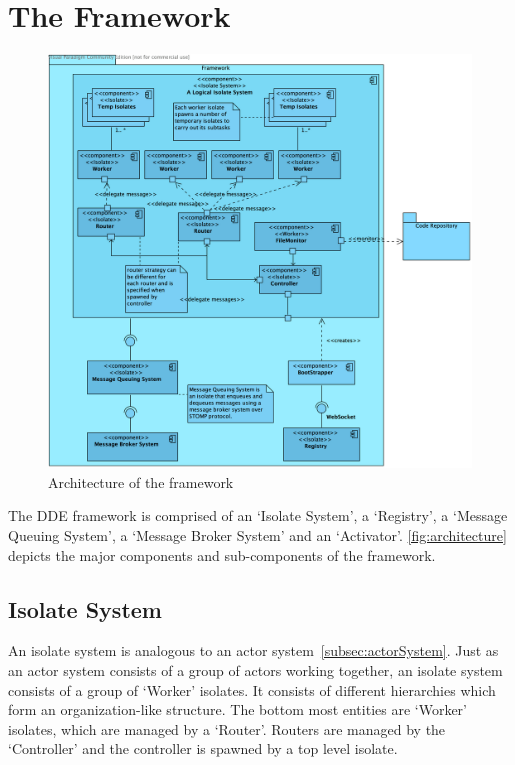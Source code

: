 \section{The Framework}
\begin{figure}[H]
  \centering
  \includegraphics[width=1\textwidth]{figures/componentDiagram}
  \caption[Architecture of the framework]{Architecture of the framework}
  \label{fig:architecture}
\end{figure}

The \acrshort{DDE} framework is comprised of an ‘Isolate System’, a ‘Registry’, a ‘Message Queuing System’, a ‘Message Broker System’ and an ‘Activator’. \autoref{fig:architecture} depicts the major components and sub-components of the framework.

  \subsection{Isolate System}
  \label{sub:isolate-system}
  An isolate system is analogous to an actor system~\autoref{subsec:actorSystem}. Just as an actor system consists of a group of actors working together, an isolate system consists of a group of ‘Worker’ isolates. It consists of different hierarchies which form an organization-like structure. The bottom most entities are ‘Worker’ isolates, which are managed by a ‘Router’. Routers are managed by the ‘Controller’ and the controller is spawned by a top level isolate.

